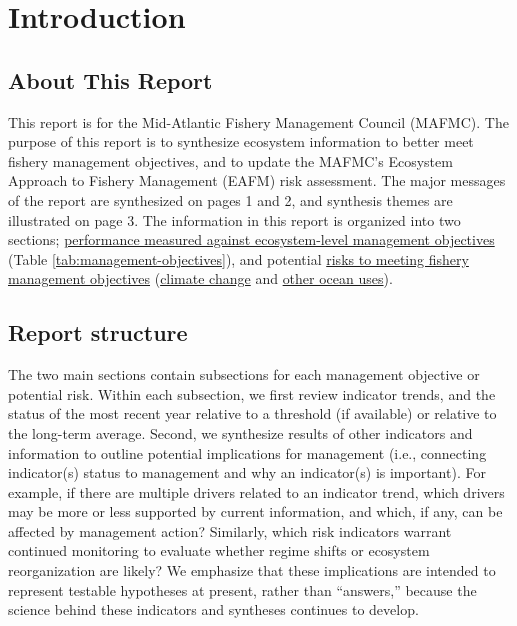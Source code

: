 \documentclass[
  10pt,
]{article}
\author{}
\date{\vspace{-2.5em}}
\begin{document}
\setcounter{page}{4}

\hypertarget{introduction}{%
\section{Introduction}\label{introduction}}

\hypertarget{about-this-report}{%
\subsection{About This Report}\label{about-this-report}}

This report is for the Mid-Atlantic Fishery Management Council (MAFMC).
The purpose of this report is to synthesize ecosystem information to
better meet fishery management objectives, and to update the MAFMC's
Ecosystem Approach to Fishery Management (EAFM) risk assessment. The
major messages of the report are synthesized on pages 1 and 2, and
synthesis themes are illustrated on page 3. The information in this
report is organized into two sections;
\protect\hyperlink{performance-relative-to-fishery-management-objectives}{performance
measured against ecosystem-level management objectives} (Table
\ref{tab:management-objectives}), and potential
\protect\hyperlink{risks-to-meeting-fishery-management-objectives}{risks
to meeting fishery management objectives}
(\protect\hyperlink{climate-and-ecosystem-productivity}{climate change}
and \protect\hyperlink{other-ocean-uses-offshore-wind}{other ocean
uses}).

\hypertarget{report-structure}{%
\subsection{Report structure}\label{report-structure}}

The two main sections contain subsections for each management objective
or potential risk. Within each subsection, we first review indicator
trends, and the status of the most recent year relative to a threshold
(if available) or relative to the long-term average. Second, we
synthesize results of other indicators and information to outline
potential implications for management (i.e., connecting indicator(s)
status to management and why an indicator(s) is important). For example,
if there are multiple drivers related to an indicator trend, which
drivers may be more or less supported by current information, and which,
if any, can be affected by management action? Similarly, which risk
indicators warrant continued monitoring to evaluate whether regime
shifts or ecosystem reorganization are likely? We emphasize that these
implications are intended to represent testable hypotheses at present,
rather than ``answers,'' because the science behind these indicators and
syntheses continues to develop.
\end{document}
